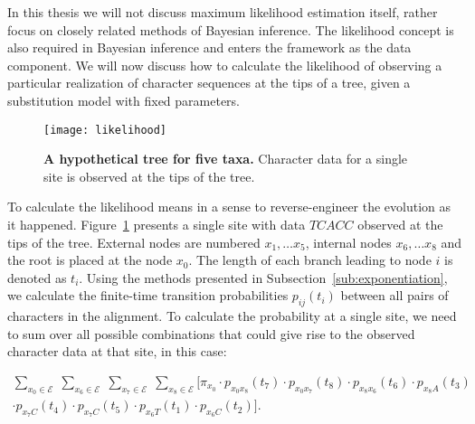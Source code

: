 In this thesis we will not discuss maximum likelihood estimation itself, %
rather focus on closely related 
methods of Bayesian inference.
The likelihood concept is also required in Bayesian inference and enters the framework as the data component.
We will now discuss how to calculate the likelihood of observing a particular realization of character sequences at the tips of a tree, given a substitution model with fixed parameters.

\begin{figure}[h!]
\centering
\texttt{[image: likelihood]} 
\caption{
{ \footnotesize 
{\bf  A hypothetical tree for five taxa.} Character data for a single site is observed at the tips of the tree.
} %
}
\label{fig:LIKELIHOOD}
\end{figure}

To calculate the likelihood means in a sense to reverse-engineer the evolution as it happened.
Figure~\ref{fig:LIKELIHOOD} presents a single site with data $TCACC$ observed at the tips of the tree.
External nodes are numbered $x_{1}, \ldots x_{5}$, internal nodes $x_{6}, \ldots x_{8}$ and the root is placed at the node $x_{0}$.
The length of each branch leading to node $i$ is denoted as $t_{i}$. 
Using the methods presented in Subsection~\ref{sub:exponentiation}, we calculate the finite-time transition probabilities $p_{ij}(t_{i})$ between all pairs of characters in the alignment.
To calculate the probability at a single site, we need to sum over all possible combinations that could give rise to the observed character data at that site, in this case:

\begin{align}
\underset{x_{0}\in \mathcal{E}}{\sum}\;\underset{x_{6}\in \mathcal{E}}{\sum}\;\underset{x_{7}\in \mathcal{E}}{\sum}\;\underset{x_{8}\in \mathcal{E}}{\sum}[\pi_{x_{0}}\cdot p_{x_{0}x_{8}}(t_{7})\cdot p_{x_{0}x_{7}}(t_{8})\cdot p_{x_{8}x_{6}}(t_{6})\cdot p_{x_{8}A}(t_{3}) \nonumber \\
\cdot p_{x_{7}C}(t_{4})\cdot p_{x_{7}C}(t_{5})\cdot p_{x_{6}T}(t_{1})\cdot p_{x_{6}C}(t_{2})].
\label{eq:likelihoodNaive}
\end{align}

